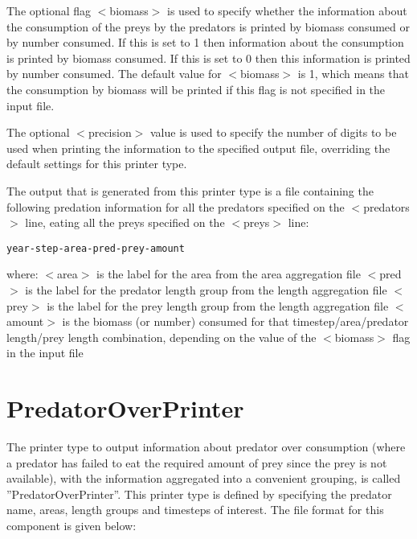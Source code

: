 \documentclass[10pt,twoside]{book}
\begin{document}
\bigskip
The optional flag $<$biomass$>$ is used to specify whether the information about the consumption of the preys by the predators is printed by biomass consumed or by number consumed.  If this is set to 1 then information about the consumption is printed by biomass consumed.  If this is set to 0 then this information is printed by number consumed.  The default value for $<$biomass$>$ is 1, which means that the consumption by biomass will be printed if this flag is not specified in the input file.

\bigskip
The optional $<$precision$>$ value is used to specify the number of digits to be used when printing the information to the specified output file, overriding the default settings for this printer type.

\bigskip
The output that is generated from this printer type is a file containing the following predation information for all the predators specified on the $<$predators$>$ line, eating all the preys specified on the $<$preys$>$ line:

{\small\begin{verbatim}
year-step-area-pred-prey-amount
\end{verbatim}}

where:\newline
$<$area$>$ is the label for the area from the area aggregation file\newline
$<$pred$>$ is the label for the predator length group from the length aggregation file\newline
$<$prey$>$ is the label for the prey length group from the length aggregation file\newline
$<$amount$>$ is the biomass (or number) consumed for that timestep/area/predator length/prey length combination, depending on the value of the $<$biomass$>$ flag in the input file

\section{PredatorOverPrinter}\label{sec:predatoroverprinter}
The printer type to output information about predator over consumption (where a predator has failed to eat the required amount of prey since the prey is not available), with the information aggregated into a convenient grouping, is called ''PredatorOverPrinter''.  This printer type is defined by specifying the predator name, areas, length groups and timesteps of interest.  The file format for this component is given below:
\end{document}
